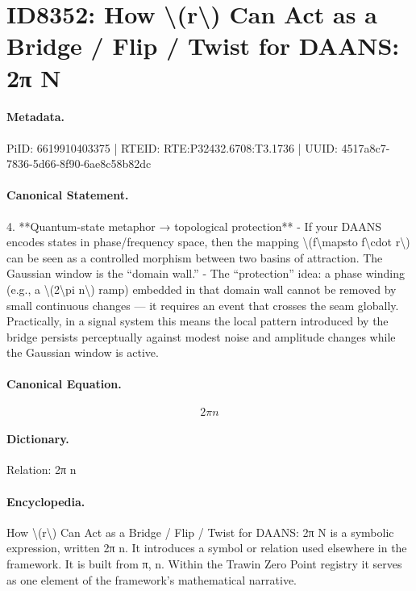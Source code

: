 \section*{ID8352: How \textbackslash{}(r\textbackslash{}) Can Act as a Bridge / Flip / Twist for DAANS: 2π N}
\paragraph{Metadata.}
PiID: 6619910403375 | RTEID: RTE:P32432.6708:T3.1736 | UUID: 4517a8c7-7836-5d66-8f90-6ae8c58b82dc

\paragraph{Canonical Statement.}
4. **Quantum-state metaphor → topological protection** - If your DAANS encodes states in phase/frequency space, then the mapping \textbackslash{}(f\textbackslash{}mapsto f\textbackslash{}cdot r\textbackslash{}) can be seen as a controlled morphism between two basins of attraction. The Gaussian window is the “domain wall.” - The “protection” idea: a phase winding (e.g., a \textbackslash{}(2\textbackslash{}pi n\textbackslash{}) ramp) embedded in that domain wall cannot be removed by small continuous changes — it requires an event that crosses the seam globally. Practically, in a signal system this means the local pattern introduced by the bridge persists perceptually against modest noise and amplitude changes while the Gaussian window is active.

\paragraph{Canonical Equation.}
\[
2\pi n
\]

\paragraph{Dictionary.}
Relation: 2π n

\paragraph{Encyclopedia.}
How \textbackslash{}(r\textbackslash{}) Can Act as a Bridge / Flip / Twist for DAANS: 2π N is a symbolic expression, written 2π n. It introduces a symbol or relation used elsewhere in the framework. It is built from π, n. Within the Trawin Zero Point registry it serves as one element of the framework's mathematical narrative.
